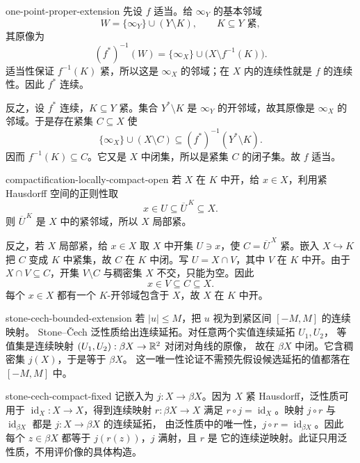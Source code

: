 \begin{solution}{one-point-proper-extension}
先设 \(f\) 适当。给 \(\infty_Y\) 的基本邻域
\[
 W=\{\infty_Y\}\cup(Y\setminus K),
 \qquad K\subseteq Y\text{ 紧},
\]
其原像为
\[
 (f^*)^{-1}(W)
 =\{\infty_X\}\cup\bigl(X\setminus f^{-1}(K)\bigr).
\]
适当性保证 \(f^{-1}(K)\) 紧，所以这是 \(\infty_X\) 的邻域；在 \(X\)
内的连续性就是 \(f\) 的连续性。因此 \(f^*\) 连续。

反之，设 \(f^*\) 连续，\(K\subseteq Y\) 紧。集合
\(Y^*\setminus K\) 是 \(\infty_Y\) 的开邻域，故其原像是
\(\infty_X\) 的邻域。于是存在紧集 \(C\subseteq X\) 使
\[
 \{\infty_X\}\cup(X\setminus C)
 \subseteq (f^*)^{-1}(Y^*\setminus K).
\]
因而 \(f^{-1}(K)\subseteq C\)。它又是 \(X\) 中闭集，所以是紧集 \(C\)
的闭子集。故 \(f\) 适当。
\end{solution}

\begin{solution}{compactification-locally-compact-open}
若 \(X\) 在 \(K\) 中开，给 \(x\in X\)，利用紧 Hausdorff 空间的正则性取
\[
 x\in U\subseteq\overline U^{\,K}\subseteq X.
\]
则 \(\overline U^{\,K}\) 是 \(X\) 中的紧邻域，所以 \(X\) 局部紧。

反之，若 \(X\) 局部紧，给 \(x\in X\) 取 \(X\) 中开集 \(U\ni x\)，使
\(C=\overline U^{\,X}\) 紧。嵌入 \(X\hookrightarrow K\) 把 \(C\) 变成
\(K\) 中紧集，故 \(C\) 在 \(K\) 中闭。写 \(U=X\cap V\)，其中 \(V\)
在 \(K\) 中开。由于 \(X\cap V\subseteq C\)，开集 \(V\setminus C\)
与稠密集 \(X\) 不交，只能为空。因此
\[
 x\in V\subseteq C\subseteq X.
\]
每个 \(x\in X\) 都有一个 \(K\)-开邻域包含于 \(X\)，故 \(X\) 在 \(K\)
中开。
\end{solution}

\begin{solution}{stone-cech-bounded-extension}
若 \(|u|\le M\)，把 \(u\) 视为到紧区间 \([-M,M]\) 的连续映射。
Stone--Čech 泛性质给出连续延拓。对任意两个实值连续延拓 \(U_1,U_2\)，
等值集是连续映射 \((U_1,U_2):\beta X\to\mathbb{R}^2\) 对闭对角线的原像，
故在 \(\beta X\) 中闭。它含稠密集 \(j(X)\)，于是等于 \(\beta X\)。
这一唯一性论证不需预先假设候选延拓的值都落在 \([-M,M]\) 中。
\end{solution}

\begin{solution}{stone-cech-compact-fixed}
记嵌入为 \(j:X\to\beta X\)。因为 \(X\) 紧 Hausdorff，泛性质可用于
\(\operatorname{id}_X:X\to X\)，得到连续映射 \(r:\beta X\to X\)
满足 \(r\circ j=\operatorname{id}_X\)。映射 \(j\circ r\) 与
\(\operatorname{id}_{\beta X}\) 都是 \(j:X\to\beta X\) 的连续延拓，
由泛性质中的唯一性，\(j\circ r=\operatorname{id}_{\beta X}\)。因此
每个 \(z\in\beta X\) 都等于 \(j(r(z))\)，\(j\) 满射，且 \(r\) 是
它的连续逆映射。此证只用泛性质，不用评价像的具体构造。
\end{solution}


